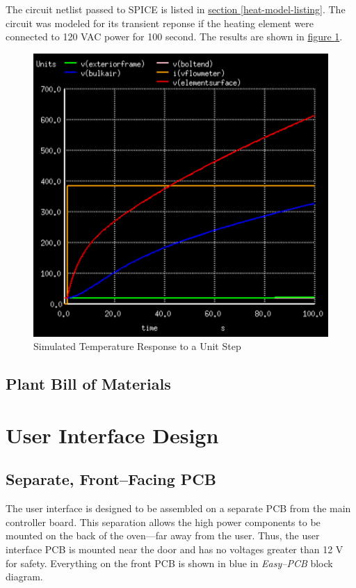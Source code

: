 \documentclass[10pt, twocolumn]{article}
\begin{document}
The circuit netlist passed to SPICE is listed in
\hyperref[heat-model-listing]{section \ref{heat-model-listing}}.
The circuit was modeled for its transient reponse if the heating element
were connected to 120 VAC power for 100 second.
The results are shown in
\hyperref[heat-model-results]{figure \ref{heat-model-results}}.

\begin{figure}
	\centering
	\includegraphics[width=1\columnwidth]{Figures/heat-model-results.pdf}
	\caption{Simulated Temperature Response to a Unit Step}
	\label{heat-model-results}
\end{figure}

\subsection{Plant Bill of Materials}

\section{User Interface Design}

\subsection{Separate, Front--Facing PCB}

The user interface is designed to be assembled on a separate PCB
from the main controller board. This separation allows the high power
components to be mounted on the back of the oven---far away from the user.
Thus, the user interface PCB is mounted near the door and has no
voltages greater than 12 V for safety. Everything on the front PCB
is shown in blue in \emph{Easy--PCB} block diagram.
\end{document}
